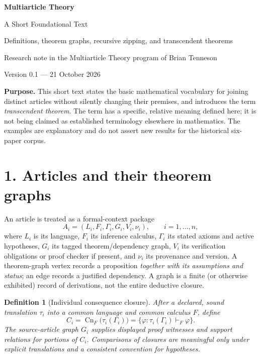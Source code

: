 \documentclass[10pt]{article}
\theoremstyle{simple}
\newtheorem{definition}{Definition}
\newcommand{\Cn}{\operatorname{Cn}}
\begin{document}
\begin{center}
{\LARGE\bfseries\color{ink} Multiarticle Theory}\par
\vspace{3pt}
{\Large A Short Foundational Text}\par
\vspace{7pt}
{\small\color{muted} Definitions, theorem graphs, recursive zipping, and transcendent theorems}\par
\vspace{5pt}
{\small Research note in the Multiarticle Theory program of Brian Tenneson}\par
{\small Version 0.1 --- 21 October 2026}
\end{center}
\vspace{3pt}
\noindent\textbf{Purpose.} This short text states the basic mathematical vocabulary for joining distinct articles without silently changing their premises, and introduces the term \emph{transcendent theorem}. The term has a specific, relative meaning defined here; it is not being claimed as established terminology elsewhere in mathematics. The examples are explanatory and do not assert new results for the historical six-paper corpus.

\section{1. Articles and their theorem graphs}
An article is treated as a formal-context package
\[
 A_i=(L_i,F_i,\Gamma_i,G_i,V_i,\nu_i),\qquad i=1,\ldots,n,
\]
where $L_i$ is its language, $F_i$ its inference calculus, $\Gamma_i$ its stated axioms and active hypotheses, $G_i$ its tagged theorem/dependency graph, $V_i$ its verification obligations or proof checker if present, and $\nu_i$ its provenance and version. A theorem-graph vertex records a proposition \emph{together with its assumptions and status}; an edge records a justified dependency. A graph is a finite (or otherwise exhibited) record of derivations, not the entire deductive closure.

\begin{definition}[Individual consequence closure]
After a declared, sound translation $\tau_i$ into a common language and common calculus $F$, define
\[
 C_i=\Cn_F\bigl(\tau_i(\Gamma_i)\bigr)
 =\{\varphi:\tau_i(\Gamma_i)\vdash_F\varphi\}.
\]
The source-article graph $G_i$ supplies displayed proof witnesses and support relations for portions of $C_i$. Comparisons of closures are meaningful only under explicit translations and a consistent convention for hypotheses.
\end{definition}
\end{document}
